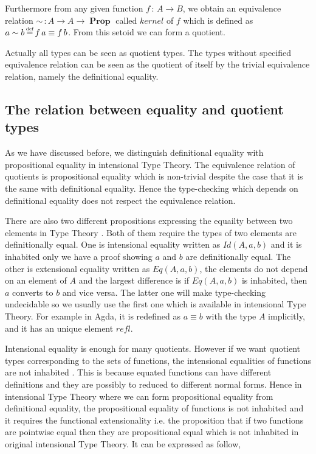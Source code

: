 \documentclass[envcountsame]{llncs}
\DeclareMathOperator{\Prop}{\mathbf{Prop}}
\DeclareMathOperator{\defi}{\stackrel{\text{\tiny def}}{=}}
\newcommand{\itt}{intensional Type Theory}
\begin{document}
Furthermore from any given function $f \,\colon\, A \to B$, we obtain an
equivalence relation $\sim \,\colon A \to A \to \Prop$ called $kernel$
of $f$ which is defined as $a \sim b \defi f \,a \equiv f \,b$. From
this setoid we can form a quotient.

Actually all types can be seen as quotient types. The types without
specified equivalence relation can be seen as the quotient of itself
by the trivial equivalence relation, namely the definitional equality.


\subsection{The relation between equality and quotient types}
As we have discussed before, we distinguish definitional equality with
propositional equality in \itt{}. The equivalence relation of
quotients is propositional equality which is
non-trivial despite the case that it is the same with definitional
equality. Hence the type-checking which depends on definitional
equality does not respect the equivalence relation.

There are also two different propositions expressing the equailty
between two elements in Type Theory \cite{nor:90}. Both of them
require the types of two elements are definitionally equal.
One is intensional equality written as $Id(A,a,b)$ and it is inhabited
only we have a proof showing $a$ and $b$ are definitionally equal. The
other is extensional equality written as $Eq(A,a,b)$, the elements
do not depend on an element of $A$ and the largest difference is if
$Eq(A,a,b)$ is inhabited, then $a$ converts to $b$ and vice versa. The
latter one will make type-checking undecidable so we usually use the
first one which is available in \itt{}. For example in Agda, it is
redefined as $a \equiv b$ with the type $A$ implicitly, and it has an
unique element $refl$.

Intensional equality is enough for many quotients. However if
we want quotient types corresponding to the sets of functions, the
intensional equalities of functions are not inhabited \cite{alt:99}. This
is because equated functions can have different definitions and they
are possibly to reduced to different normal forms. Hence in \itt{}
where we can form propositional equality from definitional equality,
the propositional equality of functions is not inhabited and it requires the
functional extensionality  i.e. the proposition that if two functions
are pointwise equal then they are propositional equal which is not inhabited in original
\itt{}. It can be expressed as follow,
\end{document}
